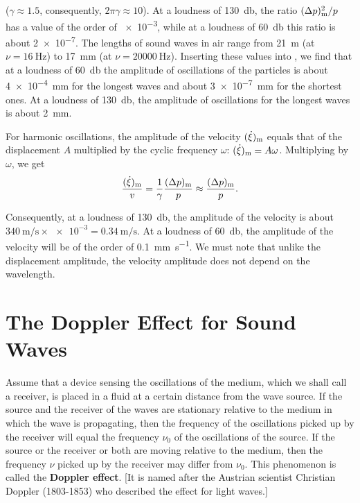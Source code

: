 \noindent
($\gamma\approx 1.5$, consequently, $2\pi\gamma\approx 10$).
At a loudness of \SI{130}{\decibel}, the ratio $(\Delta{p})^2_{\text{m}}/p$ has a value of the order of \num{e-3}, while at a loudness of \SI{60}{\decibel} this ratio is about \num{2e-7}.
The lengths of sound waves in air range from \SI{21}{\metre} (at $\nu = \SI{16}{\hertz}$) to \SI{17}{\milli\metre} (at $\nu = \SI{20000}{\hertz}$).
Inserting these values into , we find that at a loudness of \SI{60}{\decibel} the amplitude of oscillations of the particles is about \SI{4e-4}{\milli\metre} for the longest waves and about \SI{3e-7}{\milli\metre} for the shortest ones.
At a loudness of \SI{130}{\decibel}, the amplitude of oscillations for the longest waves is about \SI{2}{\milli\metre}.

For harmonic oscillations, the amplitude of the velocity $(\dot{\xi})_{\text{m}}$ equals that of the displacement $A$ multiplied by the cyclic frequency $\omega$: $(\dot{\xi})_{\text{m}} = A\omega$.
Multiplying  by $\omega$, we get
\begin{equation}\label{eq:14_76}
	\frac{(\dot{\xi})_{\text{m}}}{v} = \frac{1}{\gamma} \frac{(\Delta{p})_{\text{m}}}{p} \approx \frac{(\Delta{p})_{\text{m}}}{p}.
\end{equation}

\noindent
Consequently, at a loudness of \SI{130}{\decibel}, the amplitude of the velocity is about $\SI{340}{\metre\per\second}\times\num{e-3}=\SI{0.34}{\metre\per\second}$.
At a loudness of \SI{60}{\decibel}, the amplitude of the velocity will be of the order of \SI{0.1}{\milli\metre\per\second}.
We must note that unlike the displacement amplitude, the velocity amplitude does not depend on the wavelength.

\section{The Doppler Effect for Sound Waves}\label{sec:14_11}

Assume that a device sensing the oscillations of the medium, which we shall call a receiver, is placed in a fluid at a certain distance from the wave source.
If the source and the receiver of the waves are stationary relative to the medium in which the wave is propagating, then the frequency of the oscillations picked up by the receiver will equal the frequency $\nu_0$ of the oscillations of the source.
If the source or the receiver or both are moving relative to the medium, then the frequency $\nu$ picked up by the receiver may differ from $\nu_0$.
This phenomenon is called the \textbf{Doppler effect}. [It is named after the Austrian scientist Christian Doppler (1803-1853) who described the effect for light waves.]

